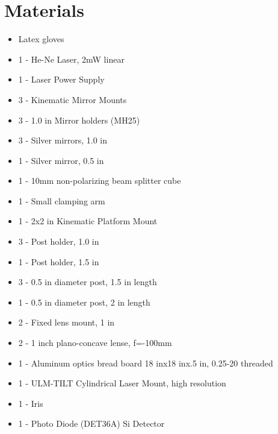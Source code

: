 \section{Materials}

\begin{itemize} \itemsep1pt \parskip0pt 
  \item Latex gloves
  \item 1 - He-Ne Laser, 2mW linear
  \item 1 - Laser Power Supply
  \item 3 - Kinematic Mirror Mounts
  \item 3 - 1.0 in Mirror holders (MH25)
  \item 3 - Silver mirrors, 1.0 in
  \item 1 - Silver mirror, 0.5 in
  \item 1 - 10mm non-polarizing beam splitter cube
  \item 1 - Small clamping arm
  \item 1 - 2x2 in Kinematic Platform Mount
  \item 3 - Post holder, 1.0 in
  \item 1 - Post holder, 1.5 in
  \item 3 - 0.5 in diameter post, 1.5 in length
  \item 1 - 0.5 in diameter post, 2 in length
  \item 2 - Fixed lens mount, 1 in
  \item 2 - 1 inch plano-concave lense, f=-100mm
  \item 1 - Aluminum optics bread board 18 inx18 inx.5 in, 0.25-20
  threaded
  \item 1 - ULM-TILT Cylindrical Laser Mount, high resolution
  \item 1 - Iris
  \item 1 - Photo Diode (DET36A) Si Detector
\end{itemize}

        
        
        
        
        
        
        
        
        
        
        
        
        
